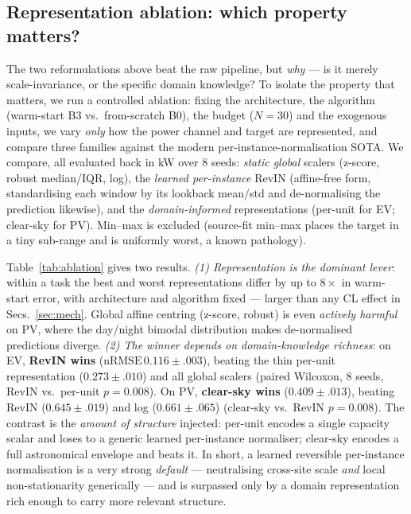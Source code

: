 \documentclass[conference]{IEEEtran}
\newcommand{\nrmse}{\mathrm{nRMSE}}
\begin{document}
\subsection{Representation ablation: which property matters?}
\label{sec:ablation}
The two reformulations above beat the raw pipeline, but \emph{why} --- is it merely
scale-invariance, or the specific domain knowledge? To isolate the property that
matters, we run a controlled ablation: fixing the architecture, the algorithm
(warm-start B3 vs.\ from-scratch B0), the budget ($N{=}30$) and the exogenous
inputs, we vary \emph{only} how the power channel and target are represented, and
compare three families against the modern per-instance-normalisation SOTA. We
compare, all evaluated back in kW over $8$ seeds: \emph{static global} scalers
(z-score, robust median/IQR, log), the \emph{learned per-instance} RevIN (affine-free
form, standardising each window by its lookback mean/std and de-normalising the
prediction likewise), and the \emph{domain-informed} representations
(per-unit for EV; clear-sky for PV). Min--max is excluded (source-fit min--max
places the target in a tiny sub-range and is uniformly worst, a known pathology).

Table~\ref{tab:ablation} gives two results. \emph{(1) Representation is the dominant
lever}: within a task the best and worst representations differ by up to $8\times$
in warm-start error, with architecture and algorithm fixed --- larger than any CL
effect in Secs.~\ref{sec:mech}. Global affine centring (z-score, robust) is even
\emph{actively harmful} on PV, where the day/night bimodal distribution makes
de-normalised predictions diverge. \emph{(2) The winner depends on domain-knowledge
richness}: on EV, \textbf{RevIN wins} ($\nrmse\,0.116{\pm}.003$), beating the thin
per-unit representation ($0.273{\pm}.010$) and all global scalers (paired Wilcoxon,
$8$ seeds, RevIN vs.\ per-unit $p{=}0.008$). On PV, \textbf{clear-sky wins}
($0.409{\pm}.013$), beating RevIN ($0.645{\pm}.019$) and log ($0.661{\pm}.065$)
(clear-sky vs.\ RevIN $p{=}0.008$). The contrast is the \emph{amount of structure}
injected: per-unit encodes a single capacity scalar and loses to a generic learned
per-instance normaliser; clear-sky encodes a full astronomical envelope and beats
it. In short, a learned reversible per-instance normalisation is a very strong
\emph{default} --- neutralising cross-site scale \emph{and} local non-stationarity
generically --- and is surpassed only by a domain representation rich enough to
carry more relevant structure.
\end{document}
